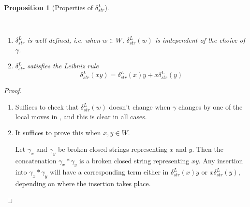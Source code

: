 \documentclass[a4paper,final, reqno]{amsart}
\theoremstyle{plain}
\newtheorem{Prop}[Th]{Proposition}
\theoremstyle{definition}
\begin{document}
	\begin{Prop}[Properties of $\delta_{str}^L$] \label{prop:deltaL}
		
		\-\
		
		\begin{enumerate}
			\item $\delta_{str}^L$ is well defined, i.e. when $w \in W$, $\delta_{str}^L(w)$ is independent of the choice of $\gamma$. 
			\item $\delta_{str}^L$ satisfies the Leibniz rule 
			\[ \delta_{str}^L(xy) = \delta_{str}^L(x)y + x\delta_{str}^L(y) \]
		\end{enumerate}
	\end{Prop}
	\begin{proof}\-\
		
		\begin{enumerate}
			\item Suffices to check that $\delta_{str}^L(w)$ doesn't change when $\gamma$ changes by one of the local moves in , and this is clear in all cases.
			\item It suffices to prove this when $x, y \in W$. 
			
			Let $\gamma_x$ and $\gamma_y$ be broken closed strings representing $x$ and $y$. Then the concatenation $\gamma_{x}*\gamma_{y}$ is a broken closed string representing $xy$. Any insertion into $\gamma_x*\gamma_y$ will have a corresponding term either in $\delta_{str}^L(x)y$ or $x\delta_{str}^L(y)$, depending on where the insertion takes place.
			
		\end{enumerate}
	\end{proof}
	
\end{document}
